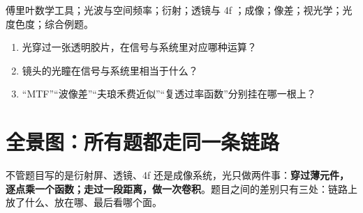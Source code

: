 \psee 傅里叶数学工具\pageref{ch:math}；光波与空间频率\pageref{ch:wave}；衍射\pageref{ch:diff}；透镜与 4f \pageref{ch:lens}；成像\pageref{ch:imaging}；像差\pageref{ch:aberr}；视光学\pageref{ch:visual}；光度色度\pageref{ch:photo}；综合例题\pageref{ch:examples}。

\begin{enumerate}[label=\arabic*.]
\item 光穿过一张透明胶片，在信号与系统里对应哪种运算？
\item 镜头的光瞳在信号与系统里相当于什么？
\item “MTF”“波像差”“夫琅禾费近似”“复透过率函数”分别挂在哪一根上？
\end{enumerate}

\section{全景图：所有题都走同一条链路}\label{sec:p-whole}

\begin{idea}[一句话]
不管题目写的是衍射屏、透镜、4f 还是成像系统，光只做两件事：\textbf{穿过薄元件，逐点乘一个函数；走过一段距离，做一次卷积}。题目之间的差别只有三处：链路上放了什么、放在哪、最后看哪个面。
\end{idea}

